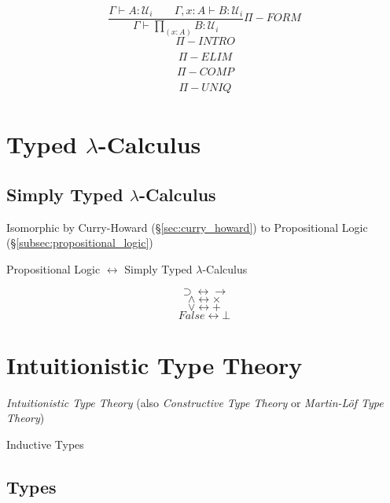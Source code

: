 \documentclass{article}
\begin{document}
\[
    {
        \frac
        {\Gamma \vdash A : \mathcal{U}_i \;\;\;\;\;\;\;
        \Gamma,x:A \vdash B : \mathcal{U}_i}
        {\Gamma \vdash \prod_{(x:A)} B : \mathcal{U}_i}
    } \Pi-FORM
\]\[
    {
        \frac
        {}
        {}
    } \Pi-INTRO
\]\[
    {
        \frac
        {}
        {}
    } \Pi-ELIM
\]\[
    {
        \frac
        {}
        {}
    } \Pi-COMP
\]\[
    {
        \frac
        {}
        {}
    } \Pi-UNIQ
\]



\section{Typed $\lambda$-Calculus}\label{sec:typed_lambda_calculus}

\subsection{Simply Typed $\lambda$-Calculus}\label{subsec:simply_typed}

Isomorphic by Curry-Howard (\S\ref{sec:curry_howard}) to
Propositional Logic (\S\ref{subsec:propositional_logic})

Propositional Logic $\leftrightarrow$ Simply Typed $\lambda$-Calculus

\[
    \supset \leftrightarrow \rightarrow
\] \[
    \wedge \leftrightarrow \times
\] \[
    \vee \leftrightarrow +
\] \[
    False \leftrightarrow \bot
\]



\section{Intuitionistic Type Theory}

\emph{Intuitionistic Type Theory} (also \emph{Constructive Type
  Theory} or \emph{Martin-L\"of Type Theory})

Inductive Types



\subsection{Types}
\end{document}
